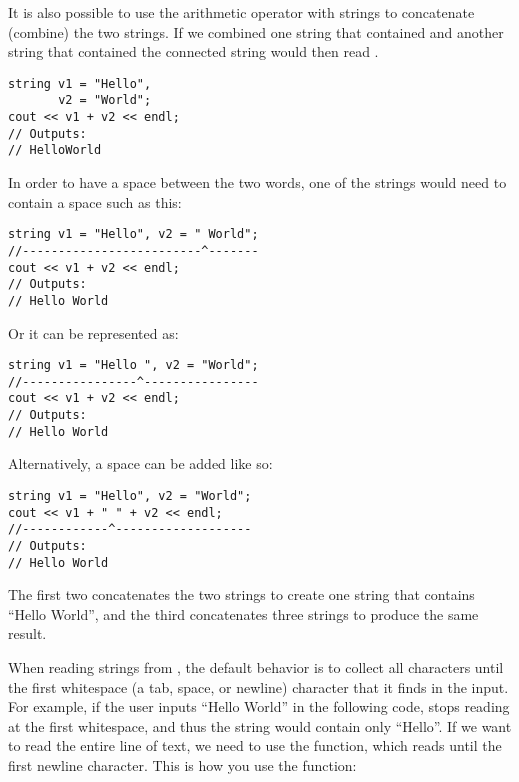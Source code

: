 \noindent It is also possible to use the arithmetic operator \Code{+} with strings to concatenate (combine) the two strings.
If we combined one string that contained  and another string that contained  the connected string would then read .

\noindent\begin{minipage}{\linewidth}\begin{lstlisting}
string v1 = "Hello",
       v2 = "World";
cout << v1 + v2 << endl;
// Outputs:
// HelloWorld
\end{lstlisting}\end{minipage}



In order to have a space between the two words, one of the strings would need to contain a space such as this:

\noindent\begin{minipage}{\linewidth}\begin{lstlisting}
string v1 = "Hello", v2 = " World";
//-------------------------^-------
cout << v1 + v2 << endl;
// Outputs:
// Hello World
\end{lstlisting}\end{minipage}

\noindent Or it can be represented as: 

\noindent\begin{minipage}{\linewidth}\begin{lstlisting}
string v1 = "Hello ", v2 = "World";
//----------------^----------------
cout << v1 + v2 << endl;
// Outputs:
// Hello World
\end{lstlisting}\end{minipage}

\noindent Alternatively, a space can be added like so:

\noindent\begin{minipage}{\linewidth}\begin{lstlisting}
string v1 = "Hello", v2 = "World";
cout << v1 + " " + v2 << endl;
//------------^-------------------
// Outputs:
// Hello World
\end{lstlisting}\end{minipage}

\noindent The first two concatenates the two strings to create one string that contains ``Hello World'', and the third concatenates three strings to produce the same result.

When reading strings from , the default behavior is to collect all characters until the first whitespace (a tab, space, or newline) character that it finds in the input.
For example, if the user inputs ``Hello World'' in the following code,  stops reading at the first whitespace, and thus the string would contain only ``Hello''.
If we want to read the entire line of text, we need to use the  function, which reads until the first newline character.
This is how you use the  function:

